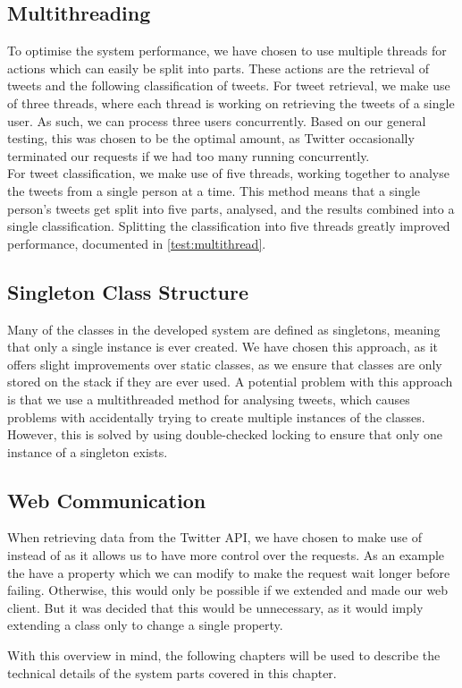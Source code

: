 \subsection{Multithreading}\label{subs:multithread}
To optimise the system performance, we have chosen to use multiple threads for
actions which can easily be split into parts. These actions are the retrieval of
tweets and the following classification of tweets. For tweet retrieval, we make
use of three threads, where each thread is working on retrieving the tweets of a
single user. As such, we can process three users concurrently. Based on our
general testing, this was chosen to be the optimal amount, as Twitter
occasionally terminated our requests if we had too many running concurrently.\\
For tweet classification, we make use of five threads, working together to
analyse the tweets from a single person at a time. This method means that a
single person's tweets get split into five parts, analysed, and the results
combined into a single classification. Splitting the classification into five
threads greatly improved performance, documented in \autoref{test:multithread}.

\subsection{Singleton Class Structure}
Many of the classes in the developed system are defined as singletons, meaning
that only a single instance is ever created. We have chosen this approach, as it
offers slight improvements over static classes, as we ensure that classes are
only stored on the stack if they are ever used. A potential problem with this
approach is that we use a multithreaded method for analysing tweets, which
causes problems with accidentally trying to create multiple instances of the
classes. However, this is solved by using double-checked locking to ensure that
only one instance of a singleton exists.

\subsection{Web Communication}
When retrieving data from the Twitter API, we have chosen to make use of
 instead of  as it allows us to have more
control over the requests. As an example the  have a
 property which we can modify to make the request wait longer
before failing. Otherwise, this would only be possible if we extended
 and made our web client. But it was decided that this would be
unnecessary, as it would imply extending a class only to change a single
property.\nl


With this overview in mind, the following chapters will be used to describe
the technical details of the system parts covered in this chapter.

















